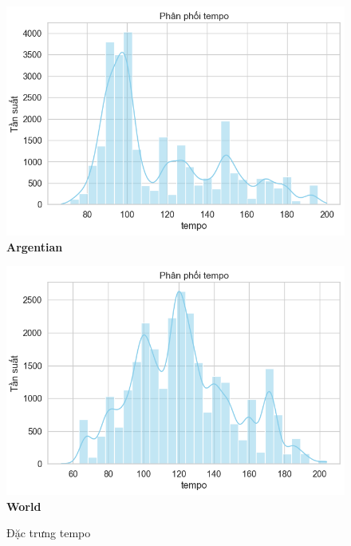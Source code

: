 \begin{itemize}
\begin{figure}[H]
        \begin{minipage}{0.45\textwidth}
            \centering
            \includegraphics[width=\linewidth]{../graphics/data_top50/figure/4/EDA_argentina.png}
            \\[4pt] {\small \textbf{Argentian}}
        \end{minipage}
        \hfill
        \begin{minipage}{0.45\textwidth}
            \centering
            \includegraphics[width=\linewidth]{../graphics/data_top50/figure/4/EDA_world.png}
            \\[4pt] {\small \textbf{World}}
        \end{minipage}



        
        \caption{Đặc trưng tempo}
        \label{fig:energy-regions}
    \end{figure}
    


\end{itemize}

